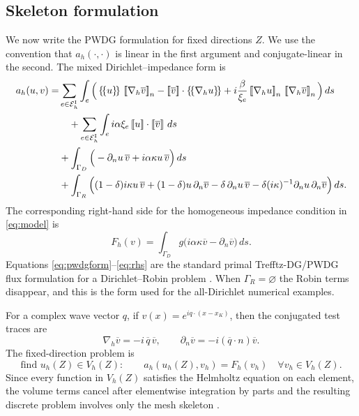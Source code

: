 \documentclass[pdflatex,sn-mathphys-num]{sn-jnl}
\theoremstyle{thmstyleone}
\theoremstyle{thmstyletwo}
\newcommand{\Ei}{\mathcal E_h^{\rm I}}
\newcommand{\jump}[1]{\left[\!\left[#1\right]\!\right]}
\newcommand{\jumpn}[1]{\left[\!\left[#1\right]\!\right]_{n}}
\newcommand{\avg}[1]{\left\{\!\left\{#1\right\}\!\right\}}
\begin{document}
\subsection{Skeleton formulation}
We now write the PWDG formulation for fixed directions $Z$.  We use the convention that $a_h(\cdot,\cdot)$ is linear in the first argument and conjugate-linear in the second.  The mixed Dirichlet--impedance form is
\begin{align}\label{eq:pwdgform}
 a_h(u,v)=&\sum_{e\in\Ei}\int_e
 \Big(
 \avg{u}\,\jumpn{\nabla_h\overline v}
 -\jump{\overline v}\cdot\avg{\nabla_hu}
 +i\frac{\beta}{\xi_e}\jumpn{\nabla_hu}\,\jumpn{\nabla_h\overline v}
 \Big)\,ds \nonumber\\
 &\quad+\sum_{e\in\Ei}\int_e i\alpha\xi_e\jump{u}\cdot\jump{\overline v}\,ds \\
 &+\int_{\Gamma_D}
 \Big(-\partial_nu\,\overline v+i\alpha\kappa u\,\overline v\Big)\,ds \nonumber\\
 &+\int_{\Gamma_R}\Big(
 (1-\delta)i\kappa u\,\overline v
 +(1-\delta)u\,\partial_n\overline v
 -\delta\,\partial_nu\,\overline v
 -\delta(i\kappa)^{-1}\partial_nu\,\partial_n\overline v
 \Big)\,ds.\nonumber
\end{align}
The corresponding right-hand side for the homogeneous impedance condition in \eqref{eq:model} is
\begin{equation}\label{eq:rhs}
 F_h(v)=\int_{\Gamma_D}
 g\Big(i\alpha\kappa\overline v-\partial_n\overline v\Big)\,ds.
\end{equation}
Equations \eqref{eq:pwdgform}--\eqref{eq:rhs} are the standard primal Trefftz-DG/PWDG flux formulation for a Dirichlet--Robin problem \cite{HiptmairMoiolaPerugia2011,HiptmairMoiolaPerugiaSurvey2016}.  When $\Gamma_R=\varnothing$ the Robin terms disappear, and this is the form used for the all-Dirichlet numerical examples.

For a complex wave vector $q$, if $v(x)=e^{iq\cdot(x-x_K)}$, then the conjugated test traces are
\[
 \nabla_h\overline v=-i\,\overline q\,\overline v,
 \qquad
 \partial_n\overline v=-i(\overline q\cdot n)\overline v.
\]
The fixed-direction problem is
\begin{equation}\label{eq:fixedPWDG}
 \text{find }u_h(Z)\in V_h(Z):\qquad
 a_h(u_h(Z),v_h)=F_h(v_h)\quad\forall v_h\in V_h(Z).
\end{equation}
Since every function in $V_h(Z)$ satisfies the Helmholtz equation on each element, the volume terms cancel after elementwise integration by parts and the resulting discrete problem involves only the mesh skeleton \cite{CessenatDespres1998,HiptmairMoiolaPerugiaSurvey2016}.
\end{document}
